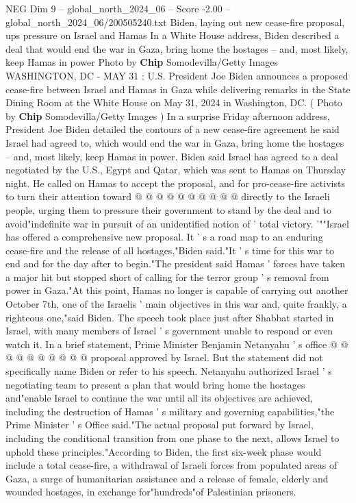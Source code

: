 \begin{textsample}{NEG Dim 9 – global\_north\_2024\_06 – Score -2.00 – global\_north\_2024\_06/200505240.txt}  \label{ex:f9_neg_167}
Biden, laying out new cease-fire proposal, ups pressure on Israel and Hamas In a White House address, Biden described a deal that would end the war in Gaza, bring home the hostages -- and, most likely, keep Hamas in power Photo by \textbf{Chip} Somodevilla/Getty Images WASHINGTON, DC - MAY 31 : U.S.
President Joe Biden announces a proposed cease-fire between Israel and Hamas in Gaza while delivering remarks in the State Dining Room at the White House on May 31, 2024 in Washington, DC. ( Photo by \textbf{Chip} Somodevilla/Getty Images ) In a surprise Friday afternoon address, President Joe Biden detailed the contours of a new cease-fire agreement he said Israel had agreed to, which would end the war in Gaza, bring home the hostages -- and, most likely, keep Hamas in power.
Biden said Israel has agreed to a deal negotiated by the U.S., Egypt and Qatar, which was sent to Hamas on Thursday night.
He called on Hamas to accept the proposal, and for pro-cease-fire activists to turn their attention toward @ @ @ @ @ @ @ @ @ @ directly to the Israeli people, urging them to pressure their government to stand by the deal and to avoid"indefinite war in pursuit of an unidentified notion of ' total victory. '""Israel has offered a comprehensive new proposal.
It ' s a road map to an enduring cease-fire and the release of all hostages,"Biden said."It ' s time for this war to end and for the day after to begin."The president said Hamas ' forces have taken a major hit but stopped short of calling for the terror group ' s removal from power in Gaza."At this point, Hamas no longer is capable of carrying out another October 7th, one of the Israelis ' main objectives in this war and, quite frankly, a righteous one,"said Biden.
The speech took place just after Shabbat started in Israel, with many members of Israel ' s government unable to respond or even watch it.
In a brief statement, Prime Minister Benjamin Netanyahu ' s office @ @ @ @ @ @ @ @ @ @ proposal approved by Israel.
But the statement did not specifically name Biden or refer to his speech.
Netanyahu authorized Israel ' s negotiating team to present a plan that would bring home the hostages and"enable Israel to continue the war until all its objectives are achieved, including the destruction of Hamas ' s military and governing capabilities,"the Prime Minister ' s Office said."The actual proposal put forward by Israel, including the conditional transition from one phase to the next, allows Israel to uphold these principles."According to Biden, the first six-week phase would include a total cease-fire, a withdrawal of Israeli forces from populated areas of Gaza, a surge of humanitarian assistance and a release of female, elderly and wounded hostages, in exchange for"hundreds"of Palestinian prisoners.

\end{textsample}
